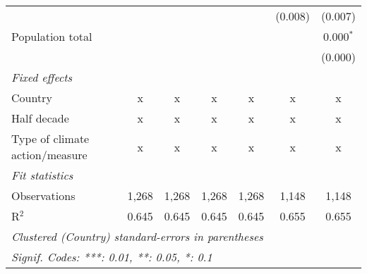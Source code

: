 \begin{tabular}{lcccccc}
                                               &         &         &         &         & (0.008)     & (0.007)\\   
   Population total                            &         &         &         &         &             & 0.000$^{*}$\\   
                                               &         &         &         &         &             & (0.000)\\   
   \emph{Fixed effects}\\
   Country                                     & x       & x       & x       & x       & x           & x\\  
   Half decade                                 & x       & x       & x       & x       & x           & x\\  
   Type of climate action/measure              & x       & x       & x       & x       & x           & x\\  
   \midrule \emph{Fit statistics}\\
   Observations                                & 1,268   & 1,268   & 1,268   & 1,268   & 1,148       & 1,148\\  
   R$^2$                                       & 0.645   & 0.645   & 0.645   & 0.645   & 0.655       & 0.655\\  
   \midrule
   \multicolumn{7}{l}{\emph{Clustered (Country) standard-errors in parentheses}}\\
   \multicolumn{7}{l}{\emph{Signif. Codes: ***: 0.01, **: 0.05, *: 0.1}}\\
\end{tabular}
\par\endgroup


